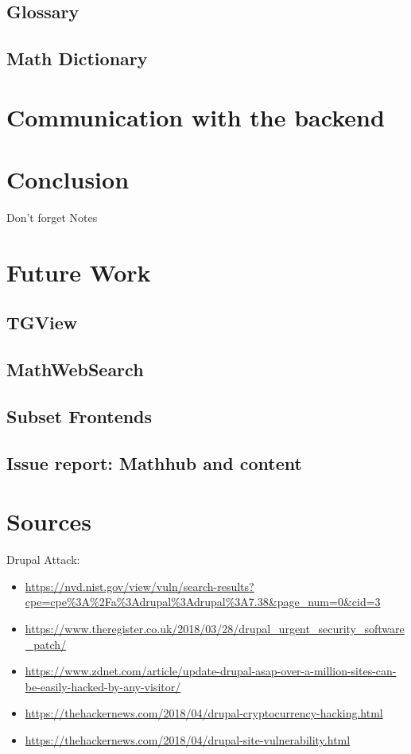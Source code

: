 \documentclass[11pt,a4paper]{article}
\begin{document}
	\subsection{Glossary}
	\subsection{Math Dictionary}

\section{Communication with the backend}

\section{Conclusion}
Don't forget Notes

\section{Future Work}
	\subsection{TGView}
	\subsection{MathWebSearch}
	\subsection{Subset Frontends}
	\subsection{Issue report: Mathhub and content}

\section{Sources}
Drupal Attack:
\begin{itemize}
\item \url{https://nvd.nist.gov/view/vuln/search-results?cpe=cpe%3A%2Fa%3Adrupal%3Adrupal%3A7.38&page_num=0&cid=3}
\item \url{https://www.theregister.co.uk/2018/03/28/drupal_urgent_security_software_patch/}
\item \url{https://www.zdnet.com/article/update-drupal-asap-over-a-million-sites-can-be-easily-hacked-by-any-visitor/}
\item \url{https://thehackernews.com/2018/04/drupal-cryptocurrency-hacking.html}
\item \url{https://thehackernews.com/2018/04/drupal-site-vulnerability.html}
\end{itemize}
\end{document}
